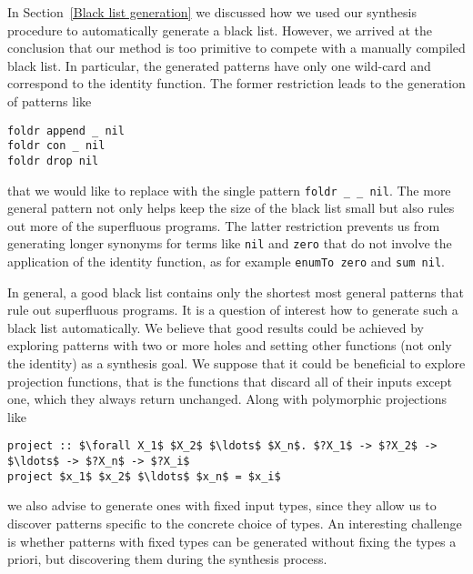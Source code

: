 In Section~\ref{Black list generation} we discussed how we used our synthesis procedure to automatically generate a black list. However, we arrived at the conclusion that our method is too primitive to compete with a manually compiled black list. In particular, the generated patterns have only one wild-card and correspond to the identity function. The former restriction leads to the generation of patterns like
\begin{lstlisting}[style=plain]
foldr append _ nil
foldr con _ nil
foldr drop nil
\end{lstlisting}
that we would like to replace with the single pattern \lstinline!foldr _ _ nil!. The more general pattern not only helps keep the size of the black list small but also rules out more of the superfluous programs.
The latter restriction prevents us from generating longer synonyms for terms like \lstinline!nil! and \lstinline!zero! that do not involve the application of the identity function, as for example \lstinline!enumTo zero! and \lstinline!sum nil!.

In general, a good black list contains only the shortest most general patterns that rule out superfluous programs. It is a question of interest how to generate such a black list automatically. We believe that good results could be achieved by exploring patterns with two or more holes and setting other functions (not only the identity) as a synthesis goal. We suppose that it could be beneficial to explore projection functions, that is the functions that discard all of their inputs except one, which they always return unchanged. Along with polymorphic projections like
\begin{lstlisting}[style=plain]
project :: $\forall X_1$ $X_2$ $\ldots$ $X_n$. $?X_1$ -> $?X_2$ -> $\ldots$ -> $?X_n$ -> $?X_i$
project $x_1$ $x_2$ $\ldots$ $x_n$ = $x_i$
\end{lstlisting}
we also advise to generate ones with fixed input types, since they allow us to discover patterns specific to the concrete choice of types. An interesting challenge is whether patterns with fixed types can be generated without fixing the types a priori, but discovering them during the synthesis process.

